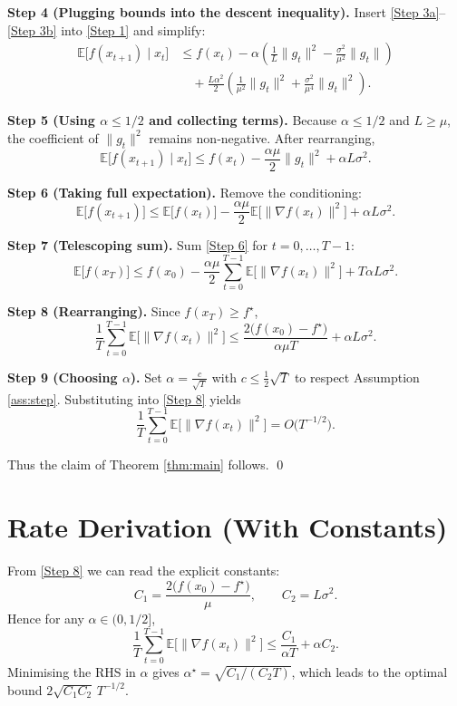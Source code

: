 \documentclass[11pt]{article}
\newcommand{\E}{\mathbb{E}}
\begin{document}
\noindent\textbf{Step 4 (Plugging bounds into the descent inequality).}  
Insert \eqref{Step 3a}–\eqref{Step 3b} into \eqref{Step 1} and simplify:
\[
\begin{aligned}
\E\!\big[f(x_{t+1})\mid x_{t}\big]
&\le f(x_{t})
-\alpha\left(\frac{1}{L}\|g_{t}\|^{2}
-\frac{\sigma^{2}}{\mu^{2}}\|g_{t}\|\right)\\
&\quad+\frac{L\alpha^{2}}{2}\left(
\frac{1}{\mu^{2}}\|g_{t}\|^{2}
+\frac{\sigma^{2}}{\mu^{4}}\|g_{t}\|^{2}\right).
\end{aligned}
\tag{Step 4}
\]

\noindent\textbf{Step 5 (Using $\alpha\le 1/2$ and collecting terms).}  
Because $\alpha\le 1/2$ and $L\ge\mu$, the coefficient of $\|g_{t}\|^{2}$
remains non‑negative.  After rearranging,
\[
\E\!\big[f(x_{t+1})\mid x_{t}\big]
\le f(x_{t})-\frac{\alpha\mu}{2}\|g_{t}\|^{2}
+\alpha L\sigma^{2}. \tag{Step 5}
\]

\noindent\textbf{Step 6 (Taking full expectation).}  
Remove the conditioning:
\[
\E\!\big[f(x_{t+1})\big]
\le \E\!\big[f(x_{t})\big]
-\frac{\alpha\mu}{2}\E\!\big[\|\nabla f(x_{t})\|^{2}\big]
+\alpha L\sigma^{2}. \tag{Step 6}
\]

\noindent\textbf{Step 7 (Telescoping sum).}  
Sum \eqref{Step 6} for $t=0,\dots,T-1$:
\[
\E\!\big[f(x_{T})\big]
\le f(x_{0})
-\frac{\alpha\mu}{2}\sum_{t=0}^{T-1}
\E\!\big[\|\nabla f(x_{t})\|^{2}\big]
+T\alpha L\sigma^{2}.
\tag{Step 7}
\]

\noindent\textbf{Step 8 (Rearranging).}  
Since $f(x_{T})\ge f^{\star}$,
\[
\frac{1}{T}\sum_{t=0}^{T-1}
\E\!\big[\|\nabla f(x_{t})\|^{2}\big]
\le
\frac{2\big(f(x_{0})-f^{\star}\big)}{\alpha\mu T}
+\alpha L\sigma^{2}.
\tag{Step 8}
\]

\noindent\textbf{Step 9 (Choosing $\alpha$).}  
Set $\alpha = \frac{c}{\sqrt{T}}$ with $c\le \frac12\sqrt{T}$ to respect
Assumption \ref{ass:step}.  Substituting into \eqref{Step 8} yields
\[
\frac{1}{T}\sum_{t=0}^{T-1}
\E\!\big[\|\nabla f(x_{t})\|^{2}\big]
= O\!\big(T^{-1/2}\big).
\tag{Step 9}
\]

Thus the claim of Theorem \ref{thm:main} follows. \qed

\section*{Rate Derivation (With Constants)}
From \eqref{Step 8} we can read the explicit constants:
\[
C_{1}=\frac{2\big(f(x_{0})-f^{\star}\big)}{\mu},\qquad
C_{2}=L\sigma^{2}.
\]
Hence for any $\alpha\in(0,1/2]$,
\[
\frac{1}{T}\sum_{t=0}^{T-1}\E\big[\|\nabla f(x_{t})\|^{2}\big]
\le \frac{C_{1}}{\alpha T}+ \alpha C_{2}.
\]
Minimising the RHS in $\alpha$ gives $\alpha^{\star}= \sqrt{C_{1}/(C_{2}T)}$,
which leads to the optimal bound $2\sqrt{C_{1}C_{2}}\,T^{-1/2}$.
\end{document}
